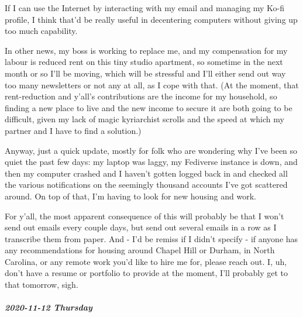 \documentclass[11pt]{article}
\begin{document}
\begin{itemize}
If I can use the Internet by interacting with my email and managing my Ko-fi profile, I think that’d be really useful in decentering computers without giving up too much capability.

In other news, my boss is working to replace me, and my compensation for my labour is reduced rent on this tiny studio apartment, so sometime in the next month or so I’ll be moving, which will be stressful and I’ll either send out way too many newsletters or not any at all, as I cope with that. (At the moment, that rent-reduction and y’all’s contributions are the income for my household, so finding a new place to live and the new income to secure it are both going to be difficult, given my lack of magic kyriarchist scrolls and the speed at which my partner and I have to find a solution.)

Anyway, just a quick update, mostly for folk who are wondering why I’ve been so quiet the past few days: my laptop was laggy, my Fediverse instance is down, and then my computer crashed and I haven’t gotten logged back in and checked all the various notifications on the seemingly thousand accounts I’ve got scattered around. On top of that, I’m having to look for new housing and work.

For y’all, the most apparent consequence of this will probably be that I won’t send out emails every couple days, but send out several emails in a row as I transcribe them from paper. And - I’d be remiss if I didn’t specify - if anyone has any recommendations for housing around Chapel Hill or Durham, in North Carolina, or any remote work you’d like to hire me for, please reach out. I, uh, don’t have a resume or portfolio to provide at the moment, I’ll probably get to that tomorrow, sigh.
\end{itemize}
\subparagraph*{2020-11-12 Thursday}
\label{sec:orgcd0d06e}
\end{document}
